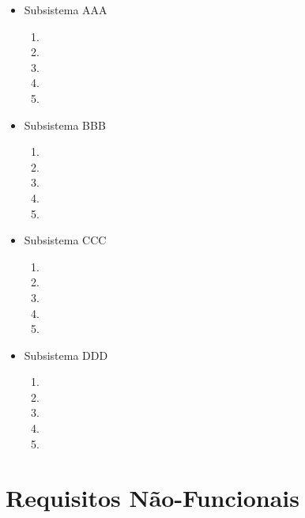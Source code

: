              \begin{itemize}
               \item Subsistema AAA
                     \begin{enumerate}
                       \item
                       \item
                       \item
                       \item
                       \item
                     \end{enumerate}
               \item Subsistema BBB
                     \begin{enumerate}
                       \item
                       \item
                       \item
                       \item
                       \item
                     \end{enumerate}
               \item Subsistema CCC
                     \begin{enumerate}
                       \item
                       \item
                       \item
                       \item
                       \item
                     \end{enumerate}
               \item Subsistema DDD
                     \begin{enumerate}
                       \item
                       \item
                       \item
                       \item
                       \item
                     \end{enumerate}
             \end{itemize}


     \section{ Requisitos N\~{a}o-Funcionais}

